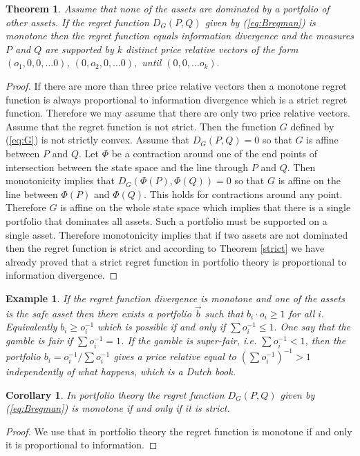 \documentclass[10pt,a4paper,draft]{article}
\newtheorem{cor}{Corollary}
\newtheorem{thm}{Theorem}
\newtheorem{Example}{Example}
\begin{document}
\begin{thm}
\label{Theorem:proper}Assume that none of the assets
are dominated
by a portfolio of other assets. If the regret function $D_G (P,Q)$ given by (\ref{eq:Bregman})
is monotone then the regret function equals information divergence and
the measures $P$ and $Q$ are supported by $k$ distinct price
relative
vectors of the form $\left(o_{1},0,0,\dots0\right)$,
$\left(0,o_{2},0,\dots0\right),$
until $\left(0,0,\dots o_{k}\right).$ 
\end{thm}
\begin{proof}
If there are more than three price relative vectors then a monotone regret function is always proportional to information divergence  which is a strict regret function. Therefore we may assume that there are only two price relative vectors. Assume that the regret function is not strict. Then the function $G$ defined by (\ref{eq:G})  is not strictly convex. Assume that $D_G (P,Q)=0$ so that $G$ is affine between $P$ and $Q$. Let $\Phi$ be a contraction around one of the end points of intersection between the state space and the line through $P$ and $Q$. Then monotonicity implies that $D_G (\Phi (P),\Phi (Q))=0$ so that $G$ is affine on the line between $\Phi (P)$ and $\Phi (Q)$. This holds for contractions around any point. Therefore $G$ is affine on the whole state space which implies that there is a single portfolio that dominates all assets. Such a portfolio must be supported on a single asset. Therefore monotonicity implies that if two assets are not dominated then the regret function is strict and according to Theorem \ref{strict} we have already proved that a strict regret function in portfolio theory is proportional to information divergence.
\end{proof}

\begin{Example}
If the regret function divergence is monotone and one of the assets is the
safe asset then there exists a portfolio $\vec{b}$ such that
$b_{i}\cdot o_{i}\geq1$
for all $i.$ Equivalently $b_{i}\geq o_{i}^{-1}$ which is
possible if and only if $\sum o_{i}^{-1}\leq1.$ One say that the gamble
is \emph{fair} if $\sum o_{i}^{-1}=1$. If the gamble is
\emph{super-fair}, i.e. $\sum o_{i}^{-1}<1$, then the portfolio
$b_{i}=o_{i}^{-1}/\sum o_{i}^{-1}$
gives a price relative equal to $\left(\sum
o_{i}^{-1}\right)^{-1}>1$
independently of what happens, which is a \emph{Dutch book}. 
\end{Example}
\begin{cor}
In portfolio theory the regret function $D_G (P,Q)$ given by (\ref{eq:Bregman}) is monotone if and only if
it is strict.
\end{cor}
\begin{proof}
We use that in portfolio theory the regret function is monotone if and only it is proportional to information.
\end{proof}
\end{document}
